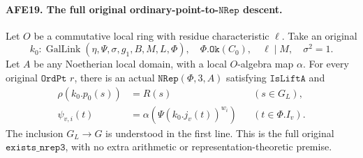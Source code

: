 \paragraph{AFE19. The full original ordinary-point-to-\(\texttt{NRep}\) descent.}
\label{claim:AFE19}
Let \(O\) be a commutative local ring with residue
characteristic \(\ell\).
Take an original
\[
 k_0:\operatorname{GalLink}(\eta,\Psi,\sigma,g_1,B,M,L,\Phi),
 \quad \Phi.\texttt{Ok}(C_0),\quad \ell\mid M,\quad\sigma^2=1.
 \]
Let \(A\) be any Noetherian local domain, with a local
\(O\)-algebra map \(\alpha\).
For every original \(\texttt{OrdPt}\) \(r\), there is
an actual \(\texttt{NRep}(\Phi,3,A)\) satisfying
\(\texttt{IsLiftA}\) and
\[
 \begin{aligned}
 \rho(k_0.p_0(s))&=R(s) &&(s\in G_L),\\
 \psi_{v,i}(t)&=\alpha(\Psi(k_0.j_v(t))^{w_i})
                                      &&(t\in\Phi.I_v).
 \end{aligned}                                         \tag{AFE.29}
\]
The inclusion \(G_L\to G\) is understood in the first
line.  This is the full original
\(\texttt{exists\_nrep3}\), with no extra arithmetic
or representation-theoretic premise.

